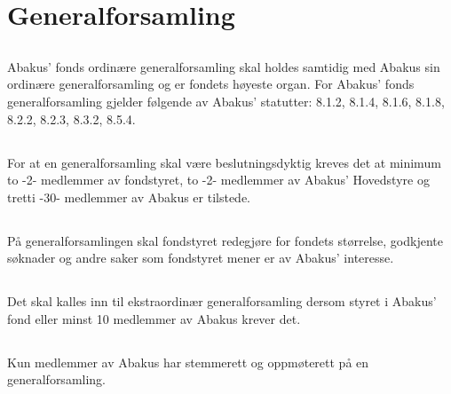 \section{Generalforsamling}

\subsection{}
Abakus’ fonds ordinære generalforsamling skal holdes samtidig med Abakus sin
ordinære generalforsamling og er fondets høyeste organ. For Abakus’ fonds
generalforsamling gjelder følgende av Abakus’ statutter: 8.1.2, 8.1.4, 8.1.6,
8.1.8, 8.2.2, 8.2.3, 8.3.2, 8.5.4.

\subsection{}
For at en generalforsamling skal være beslutningsdyktig kreves det at minimum
to -2- medlemmer av fondstyret, to -2- medlemmer av Abakus’ Hovedstyre og tretti
-30- medlemmer av Abakus er tilstede.

\subsection{}
På generalforsamlingen skal fondstyret redegjøre for fondets størrelse,
godkjente søknader og andre saker som fondstyret mener er av Abakus’
interesse.

\subsection{}
Det skal kalles inn til ekstraordinær generalforsamling dersom styret i
Abakus’ fond eller minst 10 medlemmer av Abakus krever det.

\subsection{}
Kun medlemmer av Abakus har stemmerett og oppmøterett på en generalforsamling.
